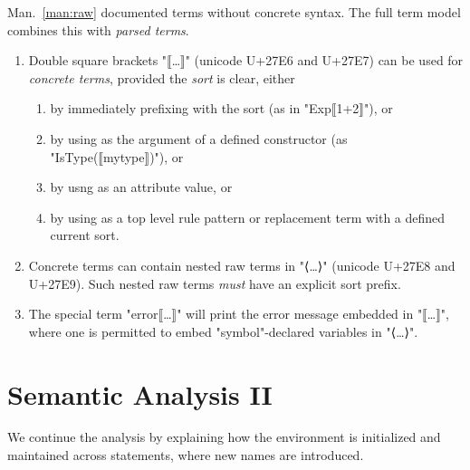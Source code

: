 \documentclass[11pt]{article} %
\begin{document}
\begin{manual}\label{man:parsed}
  Man.~\ref{man:raw} documented terms without concrete syntax. The full term model combines this
  with \emph{parsed terms}.
  \begin{enumerate}

  \item Double square brackets "⟦…⟧" (unicode U+27E6 and U+27E7) can be used for \emph{concrete
      terms}, provided the \emph{sort} is clear, either
    \begin{enumerate}
    \item by immediately prefixing with the sort (as in "Exp⟦1+2⟧"), or
    \item by using as the argument of a defined constructor (as "IsType(⟦mytype⟧)"), or
    \item by usng as an attribute value, or
    \item by using as a top level rule pattern or replacement term with a defined current sort.
    \end{enumerate}

  \item Concrete terms can contain nested raw terms in "⟨…⟩" (unicode U+27E8 and U+27E9). Such
    nested raw terms \emph{must} have an explicit sort prefix.

  \item The special term "error⟦…⟧" will print the error message embedded in "⟦…⟧", where one is
    permitted to embed "symbol"-declared variables in "⟨…⟩".

  \end{enumerate}

\end{manual}











\section{Semantic Analysis II}
\label{sec:analysis2}

We continue the analysis by explaining how the environment is initialized and maintained across
statements, where new names are introduced.
\end{document}
